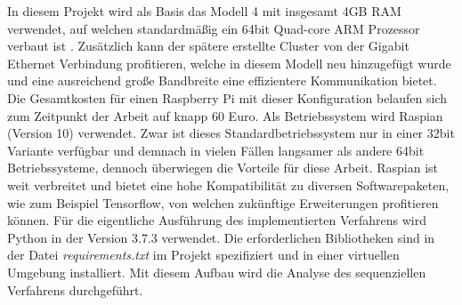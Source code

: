 In diesem Projekt wird als Basis das Modell 4 mit insgesamt 4GB \ac{RAM} verwendet, auf welchen standardmäßig ein 64bit Quad-core ARM Prozessor verbaut ist \cite{raspberryspecs}. Zusätzlich kann der spätere erstellte Cluster von der Gigabit Ethernet Verbindung profitieren, welche in diesem Modell neu hinzugefügt wurde und eine ausreichend große Bandbreite eine effizientere Kommunikation bietet. Die Gesamtkosten für einen Raspberry Pi mit dieser Konfiguration belaufen sich zum Zeitpunkt der Arbeit auf knapp 60 Euro. Als Betriebssystem wird Raspian (Version 10) verwendet. Zwar ist dieses Standardbetriebssystem nur in einer 32bit Variante verfügbar und demnach in vielen Fällen langsamer als andere 64bit Betriebssysteme, dennoch überwiegen die Vorteile für diese Arbeit. Raspian ist weit verbreitet und bietet eine hohe Kompatibilität zu diversen Softwarepaketen, wie zum Beispiel Tensorflow, von welchen zukünftige Erweiterungen profitieren können. Für die eigentliche Ausführung des implementierten Verfahrens wird Python in der Version 3.7.3 verwendet. Die erforderlichen Bibliotheken sind in der Datei \emph{requirements.txt} im Projekt spezifiziert und in einer virtuellen Umgebung installiert. Mit diesem Aufbau wird die Analyse des sequenziellen Verfahrens durchgeführt.
